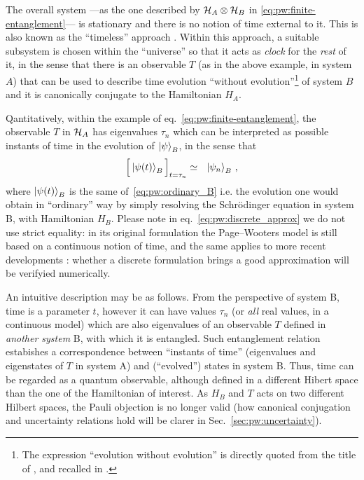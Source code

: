 The overall system
---as the one described by $\mathcal{H}_A \otimes \mathcal{H}_B$ in \eqref{eq:pw:finite-entanglement}---
is stationary and there is no notion
of time external to it.
This is also known as the
``timeless'' approach \parencite{Marletto:Evolution}.
\citereset
Within this approach,
a suitable subsystem is chosen within the ``universe'' so that it acts as
\emph{clock} for the \emph{rest} of it, in the sense that
there is an observable $T$ (as in the above example, in system $A$)
that can be used to
describe time evolution ``without evolution''\footnote{
  The expression ``evolution without evolution''
  is directly quoted from the title of \cite{PageWootters},
  and recalled in \cite{Marletto:Evolution}.
}
of system $B$
and it is canonically conjugate to the Hamiltonian $H_A$.


Qantitatively, within the example of eq.~\eqref{eq:pw:finite-entanglement},
the observable $T$ in $\mathcal{H}_A$
has eigenvalues $\tau_n$ which can be interpreted as possible
instants of time in the evolution of $\ket{\psi}_B$, in the sense that
\begin{equation}\label{eq:pw:discrete_approx}
  \Big[ \ket{\psi(t)}_B \Big]_{t=\tau_n} \simeq \,\,\,\, \ket{\psi_n}_B \, \text{,}
\end{equation}
where $\ket{\psi(t)}_B$ is the same of~\eqref{eq:pw:ordinary_B} i.e.
the evolution one would obtain in ``ordinary'' way
by simply resolving the Schr\"{o}dinger equation in system B, with Hamiltonian $H_B$.
Please note in eq.~\eqref{eq:pw:discrete_approx} we do not use strict equality:
in its original formulation the Page--Wooters model is still based on a continuous
notion of time, and the same applies to more recent developments \parencite{Lloyd:Time}:
whether a discrete formulation
brings a good approximation
will be verifyied numerically.

An intuitive description may be as follows.
From the perspective of system B, time is a parameter $t$, however it can have values
$\tau_n$ (or \emph{all} real values, in a continuous model)
which are also eigenvalues of an observable $T$ defined in \emph{another system} B,
with which it is entangled. Such entanglement relation estabishes a correspondence
between ``instants of time'' (eigenvalues and eigenstates of $T$ in system A)
and (``evolved'') states in system B. Thus, time can be regarded as a quantum observable,
although defined in a different Hibert space than the one of the Hamiltonian of interest.
As $H_B$ and $T$ acts on two different Hilbert spaces, the Pauli objection is no longer valid
(how canonical conjugation and uncertainty relations hold will be clarer in Sec.~\ref{sec:pw:uncertainty}).

